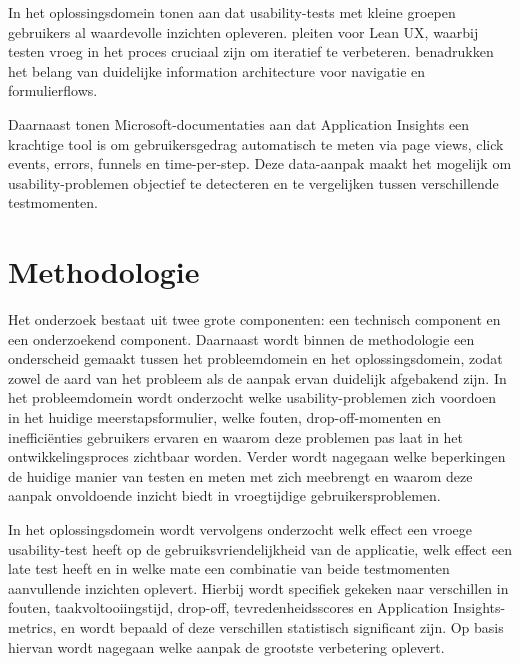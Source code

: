 In het oplossingsdomein tonen \textcite{RubinChisnell2008} aan dat usability-tests met kleine groepen gebruikers al waardevolle inzichten opleveren. \textcite{GothelfSeiden2016} pleiten voor Lean UX, waarbij testen vroeg in het proces cruciaal zijn om iteratief te verbeteren. \textcite{Rosenfeld2015} benadrukken het belang van duidelijke information architecture voor navigatie en formulierflows.

Daarnaast tonen Microsoft-documentaties aan dat Application Insights een krachtige tool is om gebruikersgedrag automatisch te meten via page views, click events, errors, funnels en time-per-step. Deze data-aanpak maakt het mogelijk om usability-problemen objectief te detecteren en te vergelijken tussen verschillende testmomenten.



\section{Methodologie}
\label{sec:methodologie}

Het onderzoek bestaat uit twee grote componenten: een technisch component en een onderzoekend component. Daarnaast wordt binnen de methodologie een onderscheid gemaakt tussen het probleemdomein en het oplossingsdomein, zodat zowel de aard van het probleem als de aanpak ervan duidelijk afgebakend zijn.
In het probleemdomein wordt onderzocht welke usability-problemen zich voordoen in het huidige meerstapsformulier, welke fouten, drop-off-momenten en inefficiënties gebruikers ervaren en waarom deze problemen pas laat in het ontwikkelingsproces zichtbaar worden. Verder wordt nagegaan welke beperkingen de huidige manier van testen en meten met zich meebrengt en waarom deze aanpak onvoldoende inzicht biedt in vroegtijdige gebruikersproblemen.

In het oplossingsdomein wordt vervolgens onderzocht welk effect een vroege usability-test heeft op de gebruiksvriendelijkheid van de applicatie, welk effect een late test heeft en in welke mate een combinatie van beide testmomenten aanvullende inzichten oplevert. Hierbij wordt specifiek gekeken naar verschillen in fouten, taakvoltooiingstijd, drop-off, tevredenheidsscores en Application Insights-metrics, en wordt bepaald of deze verschillen statistisch significant zijn. Op basis hiervan wordt nagegaan welke aanpak de grootste verbetering oplevert.

